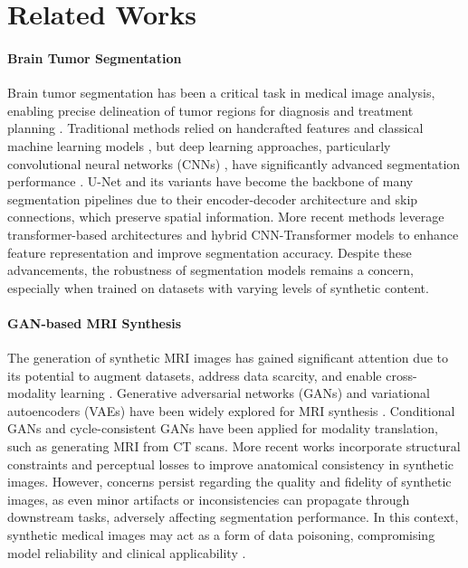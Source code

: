 \section{Related Works}
\paragraph{Brain Tumor Segmentation}  
Brain tumor segmentation has been a critical task in medical image analysis, enabling precise delineation of tumor regions for diagnosis and treatment planning \citep{wadhwa2019review, gordillo2013state}. Traditional methods relied on handcrafted features \citep{mecheter2022deep, khan2020cascading, hasan2019combining} and classical machine learning models \citep{soomro2022image, amin2019brain, bakas2018identifying}, but deep learning approaches, particularly convolutional neural networks (CNNs) \citep{li2021survey}, have significantly advanced segmentation performance \citep{havaei2017brain, pereira2016brain}. U-Net \citep{ronneberger2015u} and its variants \citep{azad2024medical, siddique2021u} have become the backbone of many segmentation pipelines due to their encoder-decoder architecture and skip connections, which preserve spatial information. More recent methods leverage transformer-based architectures \citep{ghazouani2024efficient, wang2023vision, jiang2022swinbts, huang2022transformer} and hybrid CNN-Transformer models \citep{liu2024transsea, kang2024multimodal, chen2022csu, jia2021bitr} to enhance feature representation and improve segmentation accuracy. Despite these advancements, the robustness of segmentation models remains a concern, especially when trained on datasets with varying levels of synthetic content.

\paragraph{GAN-based MRI Synthesis}  
The generation of synthetic MRI images has gained significant attention due to its potential to augment datasets, address data scarcity, and enable cross-modality learning \citep{tiwari2025review, choi2025beyond, pani2024synthetic, koetzier2024generating, hamghalam2024medical, ji2022synthetic, han2018gan, blystad2012synthetic}. Generative adversarial networks (GANs) \citep{goodfellow2014generative, goodfellow2020generative} and variational autoencoders (VAEs) \citep{kingma2013auto, pinheiro2021variational} have been widely explored for MRI synthesis \citep{tavse2022systematic, laptev2021generative}. Conditional GANs \citep{mirza2014conditional} and cycle-consistent GANs \citep{zhu2017unpaired} have been applied for modality translation, such as generating MRI from CT scans. More recent works incorporate structural constraints and perceptual losses to improve anatomical consistency in synthetic images. However, concerns persist regarding the quality and fidelity of synthetic images, as even minor artifacts or inconsistencies can propagate through downstream tasks, adversely affecting segmentation performance. In this context, synthetic medical images may act as a form of data poisoning, compromising model reliability and clinical applicability \citep{singkorapoom2023pre}.

